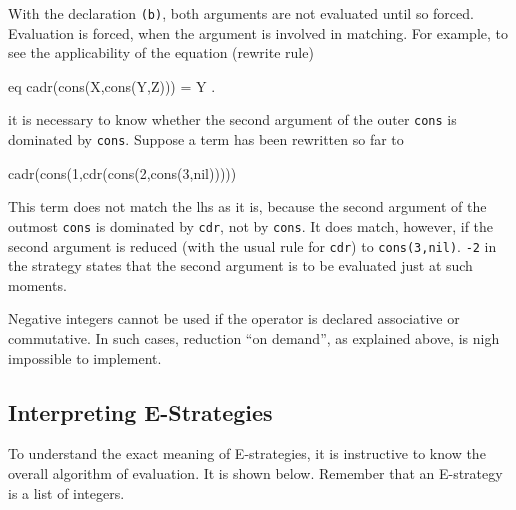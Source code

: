 \documentclass[a4paper]{memoir}
\begin{document}
With the declaration \verb|(b)|, both arguments are not evaluated until
so forced. Evaluation is forced, when the argument is involved in
matching. For example, to see the applicability of the equation (rewrite
rule)
\begin{vvtm}
\begin{ccode}
  eq cadr(cons(X,cons(Y,Z))) = Y .
\end{ccode}
\end{vvtm}
it is necessary to know whether the second argument of the outer \verb|cons|
is dominated by \verb|cons|. Suppose a term has been rewritten so
far to
\begin{vvtm}
\begin{ccode}
  cadr(cons(1,cdr(cons(2,cons(3,nil)))))
\end{ccode}
\end{vvtm}
This term does not match the lhs as it is, because the second argument of
the outmost \verb|cons| is dominated by \verb|cdr|, not by \verb|cons|.
It does match, however, if the second argument is reduced (with the
usual rule for \verb|cdr|) to \verb|cons(3,nil)|. \verb|-2| in the
strategy states
that the second argument is to be evaluated just at such moments.

Negative integers cannot be used if the operator is declared
associative or commutative. In such cases, reduction ``on demand'', as
explained above, is nigh impossible to implement.


\subsection{Interpreting E-Strategies}

To understand the exact meaning of E-strategies, it is instructive to
know the overall algorithm of evaluation. It is shown below.
Remember that an E-strategy is a list of integers.
\end{document}
